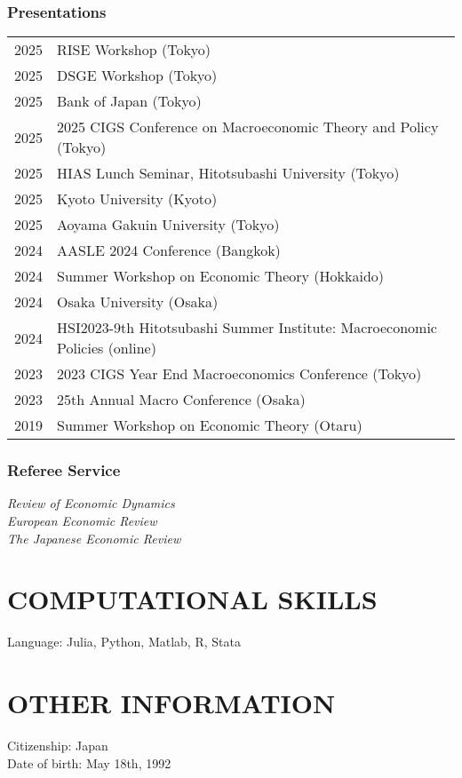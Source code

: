 \documentclass[12pt]{article}
\begin{document}
\subsubsection*{Presentations}
\begin{tabular}{@{}ll}
2025&RISE Workshop (Tokyo)\\
2025&DSGE Workshop (Tokyo)\\
2025&Bank of Japan (Tokyo)\\
2025&2025 CIGS Conference on Macroeconomic Theory and Policy (Tokyo)\\
2025&HIAS Lunch Seminar, Hitotsubashi University (Tokyo)\\
2025&Kyoto University (Kyoto)\\
2025&Aoyama Gakuin University (Tokyo)\\
2024&AASLE 2024 Conference (Bangkok)\\
2024&Summer Workshop on Economic Theory (Hokkaido)\\
2024&Osaka University (Osaka)\\
2024&HSI2023-9th Hitotsubashi Summer Institute: Macroeconomic Policies (online)\\
2023&2023 CIGS Year End Macroeconomics Conference (Tokyo)\\
2023&25th Annual Macro Conference (Osaka)\\
2019&Summer Workshop on Economic Theory (Otaru)
\end{tabular}
\subsubsection*{Referee Service}
\textit{Review of Economic Dynamics}\\
\textit{European Economic Review}\\
\textit{The Japanese Economic Review}

\section*{COMPUTATIONAL SKILLS}
Language: Julia, Python, Matlab, R, Stata

\section*{OTHER INFORMATION}
Citizenship: Japan\\
Date of birth: May 18th, 1992
\end{document}
